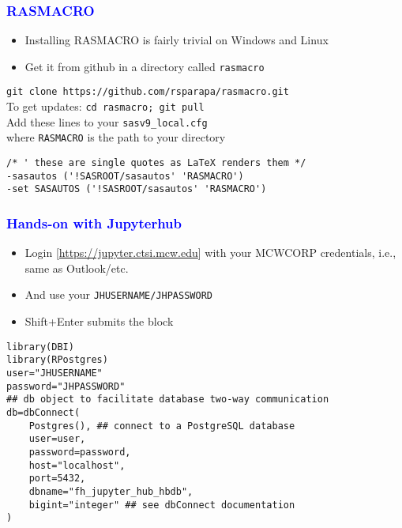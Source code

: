 \documentclass[11pt,pdftex,dvipsnames,usenames]{beamer}
\begin{document}
\begin{frame}[fragile]\frametitle{\bf\textcolor{blue}{RASMACRO}}
\begin{itemize}
\item Installing RASMACRO is fairly trivial on Windows and Linux
\item Get it from github in a directory called \texttt{rasmacro}
\end{itemize}
\texttt{git clone https://github.com/rsparapa/rasmacro.git} \\
To get updates: \texttt{cd rasmacro; git pull} \\
Add these lines to your \texttt{sasv9\_local.cfg} \\
where \texttt{RASMACRO} is the path to your directory 
\begin{verbatim}
/* ' these are single quotes as LaTeX renders them */
-sasautos ('!SASROOT/sasautos' 'RASMACRO') 
-set SASAUTOS ('!SASROOT/sasautos' 'RASMACRO')
\end{verbatim}
\end{frame}

\begin{frame}[fragile]\frametitle{\bf\textcolor{blue}{Hands-on with Jupyterhub}}
\begin{itemize}
\item Login \textcolor{PineGreen}{[\href{https://jupyter.ctsi.mcw.edu}{https://jupyter.ctsi.mcw.edu}]}
with your MCWCORP credentials, i.e., same as Outlook/etc.
\item And use your \texttt{JHUSERNAME/JHPASSWORD}
\item Shift+Enter submits the block
\end{itemize}
\begin{verbatim}
library(DBI)
library(RPostgres)
user="JHUSERNAME" 
password="JHPASSWORD"
## db object to facilitate database two-way communication
db=dbConnect(
    Postgres(), ## connect to a PostgreSQL database
    user=user,
    password=password,
    host="localhost", 
    port=5432, 
    dbname="fh_jupyter_hub_hbdb",
    bigint="integer" ## see dbConnect documentation
)
\end{verbatim}
\end{frame}
\end{document}
